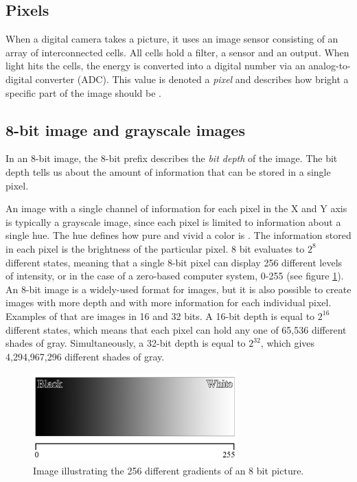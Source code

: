 \subsection{Pixels}
When a digital camera takes a picture, it uses an image sensor consisting of an array of interconnected cells. All cells hold a filter, a sensor and an output. When light hits the cells, the energy is converted into a digital number via an analog-to-digital converter (ADC). This value is denoted a \textit{pixel} and describes how bright a specific part of the image should be \citep{ip_book}.

\subsection{8-bit image and grayscale images}
In an 8-bit image, the 8-bit prefix describes the \textit{bit depth} of the image. The bit depth tells us about the amount of information that can be stored in a single pixel.

An image with a single channel of information for each pixel in the X and Y axis is typically a grayscale image, since each pixel is limited to information about a single hue. The hue defines how pure and vivid a color is \citep{visual_story}. The information stored in each pixel is the brightness of the particular pixel. 8 bit evaluates to $2^8$ different states, meaning that a single 8-bit pixel can display 256 different levels of intensity, or in the case of a zero-based computer system, 0-255 (see figure \ref{fig:ip_grayscale}). An 8-bit image is a widely-used format for images, but it is also possible to create images with more depth and with more information for each individual pixel. Examples of that are images in 16 and 32 bits. A 16-bit depth is equal to $2^{16}$ different states, which means that each pixel can hold any one of 65,536 different shades of gray. Simultaneously, a 32-bit depth is equal to $2^{32}$, which gives 4,294,967,296 different shades of gray.

\begin{figure}[htbp]
\centering
\includegraphics[width=0.7\textwidth]{Pictures/Theory/Grayscale.jpg}
\caption{Image illustrating the 256 different gradients of an 8 bit picture.}
\label{fig:ip_grayscale}
\end{figure}
 
